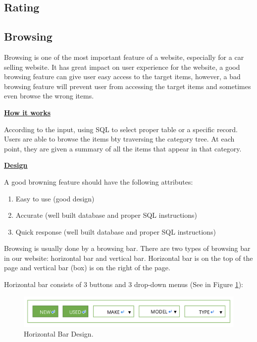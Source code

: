\documentclass[12pt]{article}
\begin{document}
\subsection{Rating}

\subsection{Browsing}
Browsing is one of the most important feature of a website, especially for a car selling website. It has great impact on user experience for the website, a good browsing feature can give user easy access to the target items, however, a bad browsing feature will prevent user from accessing the target items and sometimes even browse the wrong items.\par
\textbf{\underline{How it works}}\par
According to the input, using SQL to select proper table or a specific record. Users are able to browse the items bty traversing the category tree. At each point, they are given a summary of all the items that appear in that category.\par
\textbf{\underline{Design}}\par
A good browning feature should have the following attributes:\par
\begin{enumerate}
\item Easy to use (good design)
\item Accurate (well built database and proper SQL instructions)
\item Quick response (well built database and proper SQL instructions)
\end{enumerate}
\par Browsing is usually done by a browsing bar. There are two types of browsing bar in our website: horizontal bar and vertical bar. Horizontal bar is on the top of the page and vertical bar (box) is on the right of the page.\par
Horizontal bar consists of 3 buttons and 3 drop-down menus (See in Figure \ref{horBar}):
\begin{figure}[!h]
\caption{Horizontal Bar Design.} \label{horBar}
\begin{center}
\includegraphics[width=13cm]{horizontal_bar}
\end{center}
\end{figure}
\end{document}
